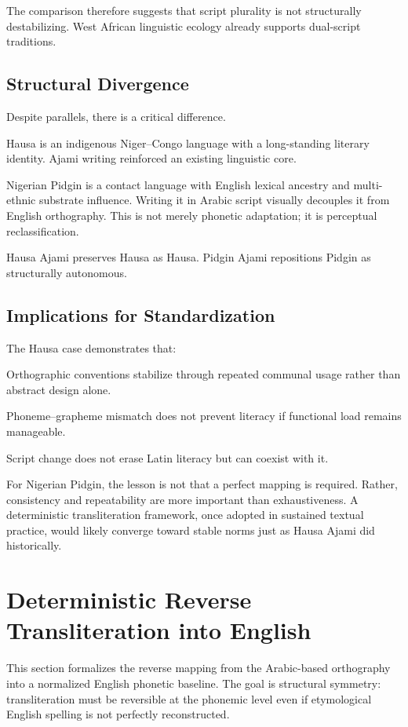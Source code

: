 \documentclass[12pt]{article}
\begin{document}
The comparison therefore suggests that script plurality is not structurally destabilizing. West African linguistic ecology already supports dual-script traditions.

\subsection{Structural Divergence}

Despite parallels, there is a critical difference.

Hausa is an indigenous Niger–Congo language with a long-standing literary identity. Ajami writing reinforced an existing linguistic core.

Nigerian Pidgin is a contact language with English lexical ancestry and multi-ethnic substrate influence. Writing it in Arabic script visually decouples it from English orthography. This is not merely phonetic adaptation; it is perceptual reclassification.

Hausa Ajami preserves Hausa as Hausa. Pidgin Ajami repositions Pidgin as structurally autonomous.

\subsection{Implications for Standardization}

The Hausa case demonstrates that:

Orthographic conventions stabilize through repeated communal usage rather than abstract design alone.

Phoneme–grapheme mismatch does not prevent literacy if functional load remains manageable.

Script change does not erase Latin literacy but can coexist with it.

For Nigerian Pidgin, the lesson is not that a perfect mapping is required. Rather, consistency and repeatability are more important than exhaustiveness. A deterministic transliteration framework, once adopted in sustained textual practice, would likely converge toward stable norms just as Hausa Ajami did historically.

\section{Deterministic Reverse Transliteration into English}

This section formalizes the reverse mapping from the Arabic-based orthography into a normalized English phonetic baseline. The goal is structural symmetry: transliteration must be reversible at the phonemic level even if etymological English spelling is not perfectly reconstructed.
\end{document}
